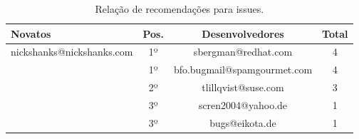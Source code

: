 \documentclass[oneside,brazil,a4paper]{normas-utf-tex}
\begin{document}
\begin{table}[hbt]
    \centering
    \scriptsize
    \caption{Relação de recomendações para issues.}
    \label{tab:novatosissue}
    \begin{tabular}{|l|c|c|c|}
        \hline
                \textbf{Novatos}
                & \textbf{Pos.}
                & \textbf{Desenvolvedores}
                & \textbf{Total}\\\hline
                    nickshanks@nickshanks.com   & 1º & sbergman@redhat.com & 4\\\hline
                                                & 1º & bfo.bugmail@spamgourmet.com & 4\\\hline
                                                & 2º & tlillqvist@suse.com & 3\\\hline
                                                & 3º & scren2004@yahoo.de & 1\\\hline
                                                & 3º & bugs@eikota.de & 1\\\hline
    \end{tabular}
\end{table}
\end{document}

